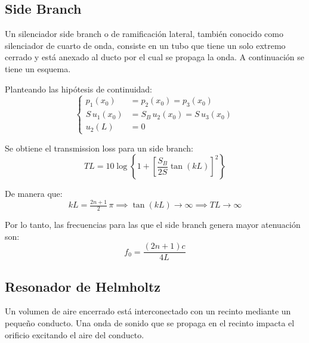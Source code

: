\documentclass[a5paper,12pt,twoside]{book}
\begin{document}
\subsection{Side Branch} 

Un silenciador side branch o de ramificación lateral, también conocido como silenciador de cuarto de onda, consiste en un tubo que tiene un solo extremo cerrado y está anexado al ducto por el cual se propaga la onda. A continuación se tiene un esquema.

\begin{center}
    \def\svgwidth{\linewidth}
    
\end{center}

Planteando las hipótesis de continuidad:
\begin{equation*}
    \left\{
    \begin{aligned}
        p_1(x_0) &= p_2(x_0) = p_3(x_0)
        \\
        S \, u_1 (x_0) &= S_B \, u_2 (x_0) = S \, u_3 (x_0)
        \\
        u_2(L) &= 0
    \end{aligned}
    \right.
\end{equation*}

Se obtiene el transmission loss para un side branch:
\begin{equation*}
    TL = 10 \log \left\{ 1 + \left[ \frac{S_B}{2S} \tan (kL) \right]^2 \right\}
\end{equation*}

De manera que:
\begin{equation*}
    kL = \tfrac{2n+1}{2} \, \pi \implies \tan (kL) \to \infty \implies TL\to\infty
\end{equation*}

Por lo tanto, las frecuencias para las que el side branch genera mayor atenuación son:
\begin{equation*}
    f_0 = \frac{\left( 2n+1 \right) c}{4L}
\end{equation*}


\subsection{Resonador de Helmholtz}

Un volumen de aire encerrado está interconectado con un recinto mediante un pequeño conducto. Una onda de sonido que se propaga en el recinto impacta el orificio excitando el aire del conducto.
\end{document}
